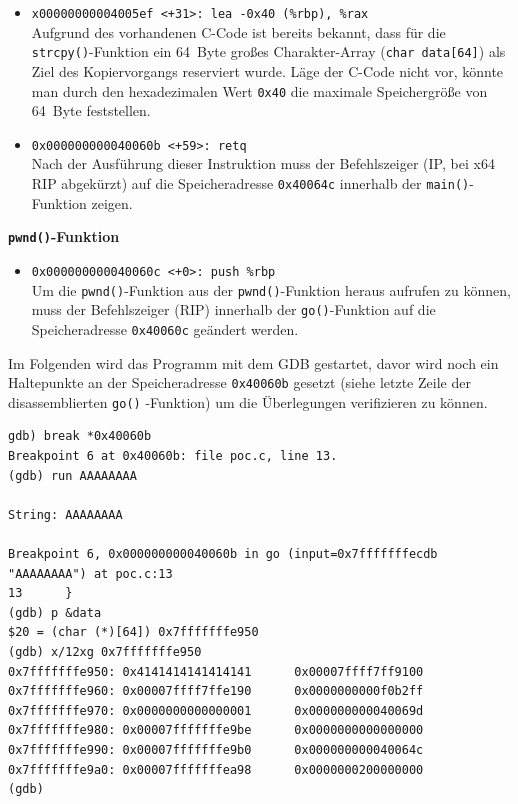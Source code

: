 \begin{itemize}
      \item \texttt{x00000000004005ef <+31>:    lea    -0x40	(\%rbp), \%rax}\\
        Aufgrund des vorhandenen C-Code ist bereits bekannt, dass für die \texttt{strcpy()}-Funktion ein \SI{64}{Byte} großes Charakter-Array (\texttt{char data[64]}) als Ziel des Kopiervorgangs reserviert wurde. Läge der C-Code nicht vor, könnte man durch den hexadezimalen Wert \texttt{0x40} die maximale Speichergröße von \SI{64}{Byte} feststellen.        
      \item \texttt{0x000000000040060b <+59>:    retq}\\
        Nach der Ausführung dieser Instruktion muss der Befehlszeiger (IP, bei x64 RIP abgekürzt) auf die Speicheradresse \texttt{0x40064c} innerhalb der \texttt{main()}-Funktion zeigen.
\end{itemize}



\textbf{\texttt{pwnd()}-Funktion}

\begin{itemize}
      \item \texttt{0x000000000040060c <+0>:     push   \%rbp}\\
        Um die \texttt{pwnd()}-Funktion aus der \texttt{pwnd()}-Funktion heraus aufrufen zu können, muss der Befehlszeiger (RIP) innerhalb der \texttt{go()}-Funktion auf die Speicheradresse \texttt{0x40060c} geändert werden. 
\end{itemize}

Im Folgenden wird das Programm mit dem GDB gestartet, davor wird noch ein Haltepunkte an der Speicheradresse \texttt{0x40060b} gesetzt (siehe letzte Zeile der disassemblierten \texttt{go()} -Funktion) um die Überlegungen verifizieren zu können.
        
\begin{lstlisting}[basicstyle=\ttfamily\footnotesize]
gdb) break *0x40060b
Breakpoint 6 at 0x40060b: file poc.c, line 13.
(gdb) run AAAAAAAA

String: AAAAAAAA

Breakpoint 6, 0x000000000040060b in go (input=0x7fffffffecdb "AAAAAAAA") at poc.c:13
13      }
(gdb) p &data
$20 = (char (*)[64]) 0x7fffffffe950
(gdb) x/12xg 0x7fffffffe950
0x7fffffffe950: 0x4141414141414141      0x00007ffff7ff9100
0x7fffffffe960: 0x00007ffff7ffe190      0x0000000000f0b2ff
0x7fffffffe970: 0x0000000000000001      0x000000000040069d
0x7fffffffe980: 0x00007fffffffe9be      0x0000000000000000
0x7fffffffe990: 0x00007fffffffe9b0      0x000000000040064c
0x7fffffffe9a0: 0x00007fffffffea98      0x0000000200000000
(gdb)
\end{lstlisting}

